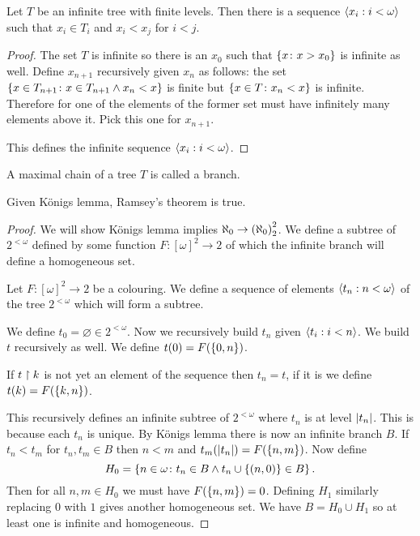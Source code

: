 \begin{theorem}
    Let \(T\) be an infinite tree with finite levels. Then there is a sequence
    \(\left<x_{i}:i<\omega\right>\) such that \(x_{i}\in T_{i}\) and
    \(x_{i}<x_{j}\) for \(i<j\).

    \begin{proof}
        The set \(T\) is infinite so there is an \(x_{0}\) such that
        \(\left\{x\colon x>x_{0}\right\}\) is infinite as well. Define \(x_{n+1}\)
        recursively given \(x_{n}\) as follows: the set \(\left\{x\in
            T_{n+1}\colon x\in T_{n+1}\wedge x_{n}<x\right\}\) is finite but \(\left\{x\in
            T\colon x_{n}<x\right\}\) is infinite. Therefore for one of the elements of the
        former set must have infinitely many elements above it. Pick this one
        for \(x_{n+1}\).

        This defines the infinite sequence \(\left<x_{i}:i<\omega\right>\).
    \end{proof}
\end{theorem}

\begin{definition}
    A maximal chain of a tree \(T\) is called a branch.
\end{definition}

\begin{proposition}
    Given Königs lemma, Ramsey's theorem is true.

    \begin{proof}
        We will show Königs lemma implies
        \(\aleph_{0}\to\left(\aleph_{0}\right)_{2}^{2}\). We define a subtree of
        \(2^{<\omega}\) defined by some function \(F:[\omega]^{2}\to2\) of which
        the infinite branch will define a homogeneous set.

        Let \(F:[\omega]^{2}\to2\) be a colouring. We define a sequence of
        elements \(\left<t_{n}:n<\omega\right>\) of the tree \(2^{<\omega}\)
        which will form a subtree.

        We define \(t_{0}=\varnothing\in 2^{<\omega}\). Now we recursively build
        \(t_{n}\) given \(\left<t_{i}:i<n\right>\). We build \(t\)
        recursively as well. We define \(t(0)=F(\left\{0,n\right\})\).

        If \(t\upharpoonright k\) is not yet an element of the sequence then
        \(t_{n}=t\), if it is we define \(t(k)=F(\left\{k,n\right\})\).

        This recursively defines an infinite subtree of \(2^{<\omega}\) where
        \(t_{n}\) is at level \(\lvert t_{n}\rvert\). This is because each \(t_{n}\) is
        unique. By Königs lemma there is now an infinite branch \(B\). If
        \(t_{n}<t_{m}\) for \(t_{n},t_{m}\in B\) then \(n<m\) and
        \(t_{m}(\lvert t_{n}\rvert)=F(\left\{n,m\right\})\). Now define
        \[
            H_{0}=\left\{n\in\omega\colon t_{n}\in B\wedge t_{n}\cup\left\{(n,0)\right\}\in B\right\}.
        \]
        Then for all \(n,m\in H_{0}\) we must have \(F(\left\{n,m\right\})=0\). Defining
        \(H_{1}\) similarly replacing \(0\) with \(1\) gives another homogeneous
        set. We have \(B=H_{0}\cup H_{1}\) so at least one is infinite and
        homogeneous.
    \end{proof}
\end{proposition}

